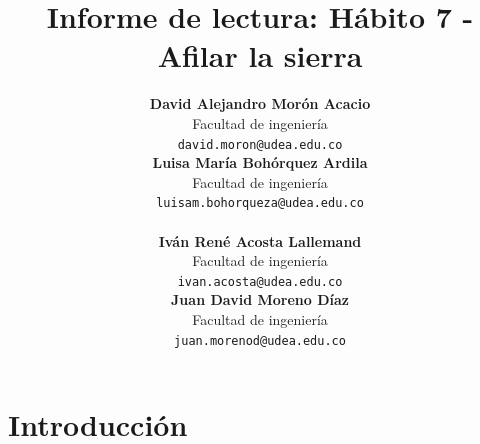 \documentclass[onecolumn]{article} %
\begin{document}
	
	\title{
		\textbf{Informe de lectura: Hábito 7 - Afilar la sierra}
		}
		
	
	\author{
		\centering
		\begin{minipage}{0.45\textwidth}
			\centering
			\textbf{David Alejandro Morón Acacio}\\
			Facultad de ingeniería\\
			\texttt{david.moron@udea.edu.co}\\
			\vspace{10pt}  
			\textbf{Luisa María Bohórquez Ardila}\\
			Facultad de ingeniería\\
			\texttt{luisam.bohorqueza@udea.edu.co}\\
		\end{minipage}%
		\hfill
		\begin{minipage}{0.45\textwidth}
			\centering
			\textbf{Iván René Acosta Lallemand}\\
			Facultad de ingeniería\\
			\texttt{ivan.acosta@udea.edu.co}\\
			\vspace{10pt}
			\textbf{Juan David Moreno Díaz}\\
			Facultad de ingeniería\\
			\texttt{juan.morenod@udea.edu.co}
		\end{minipage}
	}
	
	\date{} %
	
	\maketitle
	
	\thispagestyle{firstpage}
	
	\section{Introducción}
	
\end{document}
